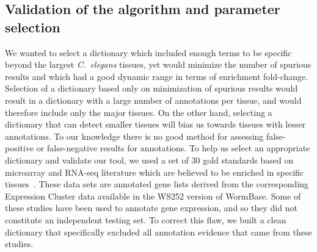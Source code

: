 \documentclass{bmcart}
\begin{document}
\subsection*{Validation of the algorithm and parameter selection}
We wanted to select a dictionary which included enough terms to be specific beyond the largest \emph{C.~elegans} tissues, yet would minimize the number of spurious results and which had a good dynamic range in terms of enrichment fold-change. Selection of a dictionary based only on minimization of spurious results would result in a dictionary with a large number of annotations per tissue, and would therefore include only the major tissues. On the other hand, selecting a dictionary that can detect smaller tissues will bias us towards tissues with lesser annotations. To our knowledge there is no good method for assessing false-positive or false-negative results for
annotations.
To help us select an appropriate dictionary and validate our tool, we used a set of 30 gold standards based on microarray and RNA-seq literature which are believed to be enriched in specific tissues~\cite{Gaudet2004a, Spencer2011,
Cinar2005, Watson2008a, Pauli2006, Portman2004, Fox2007, Smith2010}. These data sets are annotated gene lists derived from the corresponding Expression Cluster data available in the WS252 version of WormBase. Some of these studies have
been used to annotate gene expression, and so they did not constitute an independent testing set. To correct this flaw, we built a clean dictionary that specifically excluded all annotation evidence that came from these studies.
\end{document}
